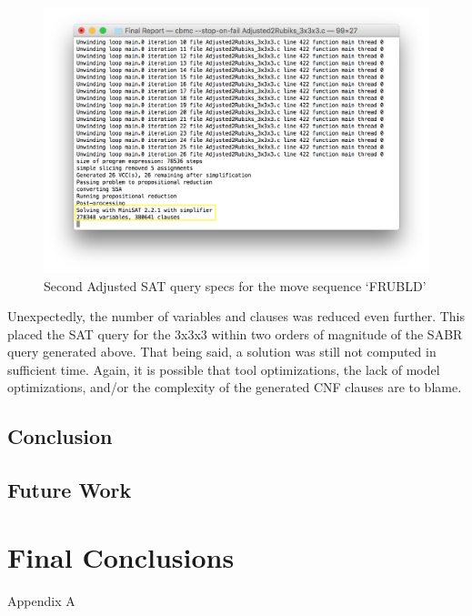 \documentclass{article}
\begin{document}
\begin{figure}[h]
\includegraphics[width=\textwidth]{pics/3x3x3Adjusted2_SAT_Query_Specs.png}
\caption{Second Adjusted SAT query specs for the move sequence `FRUBLD'}
\end{figure}

\noindent Unexpectedly, the number of variables and clauses was reduced even further. This placed the SAT query for the 3x3x3 within two orders of magnitude of the SABR query generated above. That being said, a solution was still not computed in sufficient time. Again, it is possible that tool optimizations, the lack of model optimizations, and/or the complexity of the generated CNF clauses are to blame.

\subsection {Conclusion}

\subsection {Future Work}

\newpage

\section{Final Conclusions}


\pagebreak
\begin{center}
Appendix A
\end{center}
\end{document}
